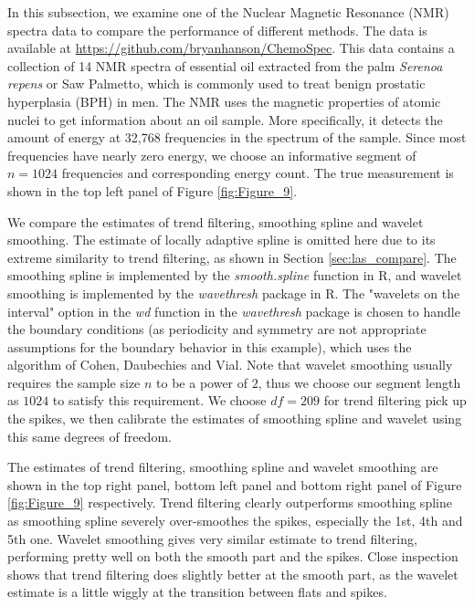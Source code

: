 \documentclass[a4paper]{article}
\begin{document}
In this subsection, we examine one of the Nuclear Magnetic Resonance (NMR) spectra data to compare the performance of different methods. The data is available at \url{https://github.com/bryanhanson/ChemoSpec}. This data contains a collection of 14 NMR spectra of essential oil extracted from the
palm \emph{Serenoa repens} or Saw Palmetto, which is commonly used to treat
benign prostatic hyperplasia (BPH) in men. The NMR uses the magnetic properties of atomic nuclei to get information about an oil sample. More specifically, it detects the amount of energy at 32,768 frequencies in the spectrum of the sample. Since most frequencies have nearly zero energy, we choose an informative segment of $n = 1024$ frequencies and corresponding energy count. The true measurement is shown in the top left panel of Figure \ref{fig:Figure_9}.

We compare the estimates of trend filtering, smoothing spline and wavelet smoothing. The estimate of locally adaptive spline is omitted here due to its extreme similarity to trend filtering, as shown in Section \ref{sec:las_compare}. The smoothing spline is implemented by the \textit{smooth.spline} function in R, and wavelet smoothing is implemented by the \textit{wavethresh} package in R. The "wavelets on the interval" option in the \textit{wd} function in the \textit{wavethresh} package is chosen to handle the boundary conditions (as periodicity and symmetry are not appropriate assumptions for the boundary behavior in this example), which uses the algorithm of Cohen, Daubechies and Vial\cite{cohen1993wavelets}. Note that wavelet smoothing usually requires the sample size $n$ to be a power of $2$, thus we choose our segment length as $1024$ to satisfy this requirement. We choose $df = 209$ for trend filtering pick up the spikes, we then calibrate the estimates of smoothing spline and wavelet using this same degrees of freedom.

The estimates of trend filtering, smoothing spline and wavelet smoothing are shown in the top right panel, bottom left panel and bottom right panel of Figure \ref{fig:Figure_9} respectively. Trend filtering clearly outperforms smoothing spline as smoothing spline severely over-smoothes the spikes, especially the 1st, 4th and 5th one. Wavelet smoothing gives very similar estimate to trend filtering, performing pretty well on both the smooth part and the spikes. Close inspection shows that trend filtering does slightly better at the smooth part, as the wavelet estimate is a little wiggly at the transition between flats and spikes.
\end{document}
